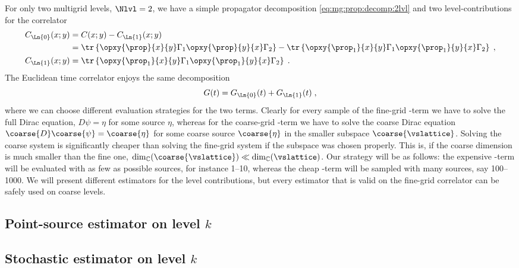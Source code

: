 For only two multigrid levels, $\Nlvl=2$, we have a simple propagator decomposition \cref{eq:mg:prop:decomp:2lvl} and two level-contributions for the correlator
\begin{align}
&\begin{aligned}
C_{\Ln{0}}(x;y)
&= C(x;y) - C_{\Ln{1}}(x;y) \\
&= \tr \left\{ \opxy{\prop}{x}{y} \Gamma_1 \opxy{\prop}{y}{x} \Gamma_2 \right\}
 - \tr \left\{ \opxy{\prop_{1}}{x}{y} \Gamma_1 \opxy{\prop_{1}}{y}{x} \Gamma_2 \right\} \;,
\end{aligned} \\
&C_{\Ln{1}}(x;y)
= \tr \left\{ \opxy{\prop_{1}}{x}{y} \Gamma_1 \opxy{\prop_{1}}{y}{x} \Gamma_2 \right\} \;.
\end{align}
The Euclidean time correlator enjoys the same decomposition
\begin{equation}
G(t) = G_{\Ln{0}}(t) + G_{\Ln{1}}(t) \;,
\end{equation}
where we can choose different evaluation strategies for the two terms.
Clearly for every sample of the fine-grid -term we have to solve the full Dirac equation, $D \psi = \eta$ for some source $\eta$, whereas for the coarse-grid -term we have to solve the coarse Dirac equation $\coarse{D} \coarse{\psi} = \coarse{\eta}$ for some coarse source $\coarse{\eta}$ in the smaller subspace $\coarse{\vslattice}$.
Solving the coarse system is significantly cheaper than solving the fine-grid system if the subspace was chosen properly.
This is, if the coarse dimension is much smaller than the fine one, $\dim_{\mathbb{C}}(\coarse{\vslattice}) \ll \dim_{\mathbb{C}}(\vslattice)$.
Our strategy will be as follows: the expensive -term will be evaluated with as few as possible sources, for instance \numrange{1}{10}, whereas the cheap -term will be sampled with many sources, say \numrange{100}{1000}.
We will present different estimators for the level contributions, but every estimator that is valid on the fine-grid correlator can be safely used on coarse levels.

\subsection{Point-source estimator on level $k$}


\subsection{Stochastic estimator on level $k$}

